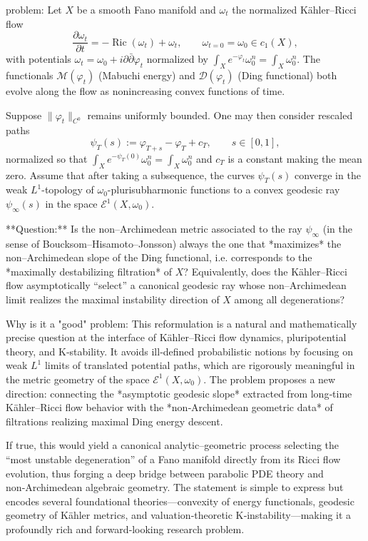 problem:  
Let \(X\) be a smooth Fano manifold and \(\omega_t\) the normalized Kähler–Ricci flow  
\[
\frac{\partial \omega_t}{\partial t} = -\operatorname{Ric}(\omega_t) + \omega_t, \qquad \omega_{t=0} = \omega_0 \in c_1(X),
\]
with potentials \(\omega_t = \omega_0 + i\partial\bar{\partial}\varphi_t\) normalized by \(\int_X e^{-\varphi_t}\omega_0^n = \int_X \omega_0^n\).  
The functionals \(\mathcal{M}(\varphi_t)\) (Mabuchi energy) and \(\mathcal{D}(\varphi_t)\) (Ding functional) both evolve along the flow as nonincreasing convex functions of time.  

Suppose \(\|\varphi_t\|_{C^0}\) remains uniformly bounded.  One may then consider rescaled paths  
\[
\psi_T(s) := \varphi_{T + s} - \varphi_T + c_T, \qquad s\in[0,1],
\]
normalized so that \(\int_X e^{-\psi_T(0)}\omega_0^n = \int_X \omega_0^n\) and \(c_T\) is a constant making the mean zero.  Assume that after taking a subsequence, the curves \(\psi_T(s)\) converge in the weak \(L^1\)-topology of \(\omega_0\)-plurisubharmonic functions to a convex geodesic ray \(\psi_\infty(s)\) in the space \(\mathcal{E}^1(X,\omega_0)\).  

**Question:**  
Is the non–Archimedean metric associated to the ray \(\psi_\infty\) (in the sense of Boucksom–Hisamoto–Jonsson) always the one that *maximizes* the non–Archimedean slope of the Ding functional, i.e. corresponds to the *maximally destabilizing filtration* of \(X\)?  Equivalently, does the Kähler–Ricci flow asymptotically “select” a canonical geodesic ray whose non–Archimedean limit realizes the maximal instability direction of \(X\) among all degenerations?

Why is it a "good" problem:  
This reformulation is a natural and mathematically precise question at the interface of Kähler–Ricci flow dynamics, pluripotential theory, and K‑stability.  It avoids ill‑defined probabilistic notions by focusing on weak \(L^1\) limits of translated potential paths, which are rigorously meaningful in the metric geometry of the space \(\mathcal{E}^1(X,\omega_0)\).  The problem proposes a new direction: connecting the *asymptotic geodesic slope* extracted from long‑time Kähler–Ricci flow behavior with the *non‑Archimedean geometric data* of filtrations realizing maximal Ding energy descent.

If true, this would yield a canonical analytic–geometric process selecting the “most unstable degeneration” of a Fano manifold directly from its Ricci flow evolution, thus forging a deep bridge between parabolic PDE theory and non‑Archimedean algebraic geometry.  The statement is simple to express but encodes several foundational theories—convexity of energy functionals, geodesic geometry of Kähler metrics, and valuation‑theoretic K‑instability—making it a profoundly rich and forward‑looking research problem.